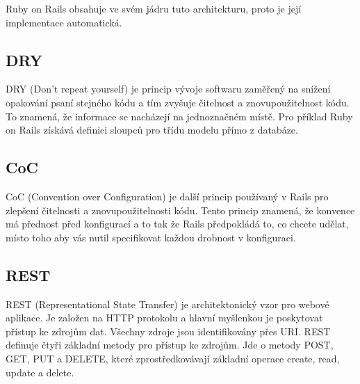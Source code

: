Ruby on Rails obsahuje ve svém jádru tuto architekturu, proto je její implementace automatická.

\subsection{DRY}
DRY (Don’t repeat yourself) je princip vývoje softwaru zaměřený na snížení opakování psaní stejného kódu a tím zvyšuje čitelnost a znovupoužitelnost kódu. To znamená, že informace se nacházejí na jednoznačném místě. Pro příklad Ruby on Rails získává definici sloupců pro třídu modelu přímo z databáze.  

\subsection{CoC}
CoC (Convention over Configuration) je další princip používaný v Rails pro zlepšení čitelnosti a znovupoužitelnosti kódu. Tento princip znamená, že konvence má přednost před konfigurací a to tak že Rails předpokládá to, co chcete udělat, místo toho aby vás nutil specifikovat každou drobnost v konfiguraci. 

\subsection{REST}
REST (Representational State Transfer) je architektonický vzor pro webové aplikace. Je založen na HTTP protokolu a hlavní myšlenkou je poskytovat přístup ke zdrojům dat. Všechny zdroje jsou identifikovány přes URI. REST definuje čtyři základní metody pro přístup ke zdrojům. Jde o metody POST, GET, PUT a DELETE, které zprostředkovávají základní operace create, read, update a delete.
